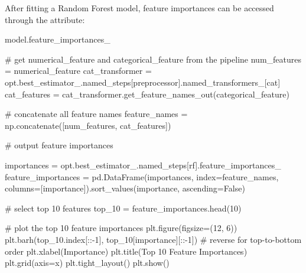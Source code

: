 \documentclass[
  letterpaper,
  DIV=11,
  numbers=noendperiod]{scrreprt}
\newenvironment{Shaded}{\begin{snugshade}}{\end{snugshade}}
\newcommand{\CommentTok}[1]{\textcolor[rgb]{0.37,0.37,0.37}{#1}}
\newcommand{\DecValTok}[1]{\textcolor[rgb]{0.68,0.00,0.00}{#1}}
\newcommand{\NormalTok}[1]{\textcolor[rgb]{0.00,0.23,0.31}{#1}}
\newcommand{\OperatorTok}[1]{\textcolor[rgb]{0.37,0.37,0.37}{#1}}
\newcommand{\StringTok}[1]{\textcolor[rgb]{0.13,0.47,0.30}{#1}}
\newcommand{\VariableTok}[1]{\textcolor[rgb]{0.07,0.07,0.07}{#1}}
\begin{document}
After fitting a Random Forest model, feature importances can be accessed
through the attribute:

\begin{Shaded}
\begin{Highlighting}[]
\NormalTok{model.feature\_importances\_}
\end{Highlighting}
\end{Shaded}

\begin{Shaded}
\begin{Highlighting}[]
\CommentTok{\# get numerical\_feature and categorical\_feature from the pipeline}
\NormalTok{num\_features }\OperatorTok{=}\NormalTok{ numerical\_feature}
\NormalTok{cat\_transformer }\OperatorTok{=}\NormalTok{ opt.best\_estimator\_.named\_steps[}\StringTok{\textquotesingle{}preprocessor\textquotesingle{}}\NormalTok{].named\_transformers\_[}\StringTok{\textquotesingle{}cat\textquotesingle{}}\NormalTok{]}
\NormalTok{cat\_features }\OperatorTok{=}\NormalTok{ cat\_transformer.get\_feature\_names\_out(categorical\_feature)}

\CommentTok{\# concatenate all feature names}
\NormalTok{feature\_names }\OperatorTok{=}\NormalTok{ np.concatenate([num\_features, cat\_features])}
\end{Highlighting}
\end{Shaded}

\begin{Shaded}
\begin{Highlighting}[]
\CommentTok{\# output feature importances}

\NormalTok{importances }\OperatorTok{=}\NormalTok{ opt.best\_estimator\_.named\_steps[}\StringTok{\textquotesingle{}rf\textquotesingle{}}\NormalTok{].feature\_importances\_}
\NormalTok{feature\_importances }\OperatorTok{=}\NormalTok{ pd.DataFrame(importances, index}\OperatorTok{=}\NormalTok{feature\_names, columns}\OperatorTok{=}\NormalTok{[}\StringTok{\textquotesingle{}importance\textquotesingle{}}\NormalTok{]).sort\_values(}\StringTok{\textquotesingle{}importance\textquotesingle{}}\NormalTok{, ascending}\OperatorTok{=}\VariableTok{False}\NormalTok{)}

\CommentTok{\# select top 10 features}
\NormalTok{top\_10 }\OperatorTok{=}\NormalTok{ feature\_importances.head(}\DecValTok{10}\NormalTok{)}

\CommentTok{\# plot the top 10 feature importances}
\NormalTok{plt.figure(figsize}\OperatorTok{=}\NormalTok{(}\DecValTok{12}\NormalTok{, }\DecValTok{6}\NormalTok{))}
\NormalTok{plt.barh(top\_10.index[::}\OperatorTok{{-}}\DecValTok{1}\NormalTok{], top\_10[}\StringTok{\textquotesingle{}importance\textquotesingle{}}\NormalTok{][::}\OperatorTok{{-}}\DecValTok{1}\NormalTok{])  }\CommentTok{\# reverse for top{-}to{-}bottom order}
\NormalTok{plt.xlabel(}\StringTok{\textquotesingle{}Importance\textquotesingle{}}\NormalTok{)}
\NormalTok{plt.title(}\StringTok{\textquotesingle{}Top 10 Feature Importances\textquotesingle{}}\NormalTok{)}
\NormalTok{plt.grid(axis}\OperatorTok{=}\StringTok{\textquotesingle{}x\textquotesingle{}}\NormalTok{)}
\NormalTok{plt.tight\_layout()}
\NormalTok{plt.show()}
\end{Highlighting}
\end{Shaded}
\end{document}
